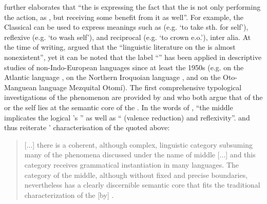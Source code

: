 \citet[18f.]{barber:1975} further elaborates that “the  is expressing the fact that the  is not only performing the action, as , but receiving some benefit from it as well”. For example, the Classical   can be used to express meanings such as  (e.g. ‘to take sth. for self’), reflexive (e.g. ‘to wash self’), and reciprocal (e.g. ‘to crown e.o.’), inter alia. At the time of writing, \citet[17]{barber:1975} argued that the “linguistic literature on the  is almost nonexistent”, yet it can be noted that the label “” has been applied in descriptive studies of non-Indo-European languages since at least the 1950s (e.g. \citealt{arnott:1956} on the Atlantic language , \citealt{chafe:1960} on the Northern Iroquoian language , and \citealt{wallis:1964} on the Oto-Manguean language Mezquital Otomí). The first comprehensive typological investigations of the phenomenon are provided by \citet{klaiman:1982, klaiman:1991} and \citet{kemmer:1993, kemmer:1994} who both argue that  of the  or the self lies at the semantic core of the . In the words of \citet[104f.]{klaiman:1991}, “the middle implicates the logical ’s ” as well as “ (valence reduction) and reflexivity”. \citeauthor{klaiman:1991} and \citeauthor{kemmer:1993} thus reiterate \citeauthor{lyons:1968}’ characterisation of the  quoted above:

\begin{quote}
	[...] there is a coherent, although complex, linguistic category subsuming many of the phenomena discussed under the name of middle [...] and this category receives grammatical instantiation in many languages. The category of the middle, although without fixed and precise boundaries, nevertheless has a clearly discernible semantic core that fits the traditional characterization of the  [by] \citeauthor{lyons:1968}. \citep[3]{kemmer:1993}
\end{quote} 

